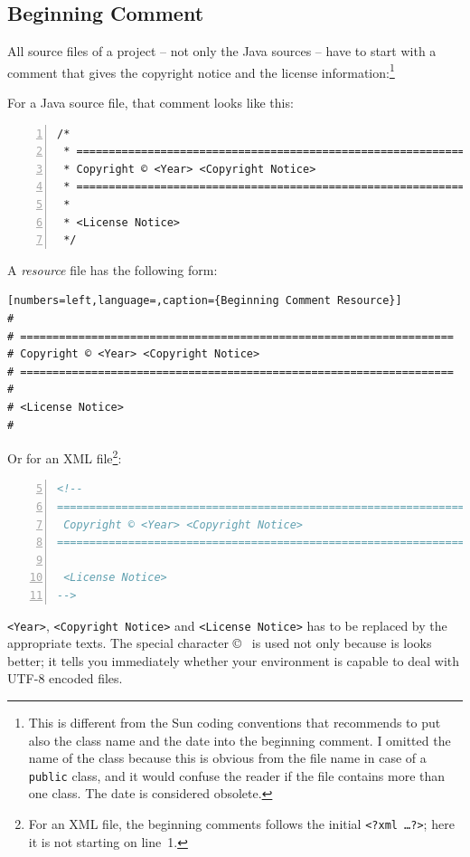 \documentclass[11pt,a4paper, titlepage, parskip=half, headsepline, footsepline, cleardoublepage=current, headheight=1cm]{scrbook}
\begin{document}
\subsection{Beginning Comment}\label{sec:BeginningComment}
All source files of a project – not only the Java sources – have to start with a comment that gives the copyright notice and the license information:\footnote{This is different from the Sun coding conventions\autocite{SUN_CODE_CONVENTIONS:BeginningComments} that recommends to put also the class name and the date into the beginning comment. I omitted the name of the class because this is obvious from the file name in case of a \lstinline|public| class, and it would confuse the reader if the file contains more than one class. The date is considered obsolete.}

For a Java source file, that comment looks like this:
\begin{lstlisting}[numbers=left,caption={Beginning Comment Java}]
/*
 * ==================================================================
 * Copyright © <Year> <Copyright Notice>
 * ==================================================================
 *
 * <License Notice>
 */
\end{lstlisting}

A \textit{resource} file has the following form: 
\begin{lstlisting}[numbers=left,language=,caption={Beginning Comment Resource}]
#
# ===================================================================
# Copyright © <Year> <Copyright Notice>
# ===================================================================
#
# <License Notice>
#
\end{lstlisting}

Or for an XML file\footnote{For an XML file, the beginning comments follows the initial \lstinline|<?xml …?>|; here it is not starting on line~1.}:
\begin{lstlisting}[numbers=left,firstnumber=5,language=XML,caption={Beginning Comment XML}]
<!--
=====================================================================
 Copyright © <Year> <Copyright Notice>
=====================================================================

 <License Notice>
-->
\end{lstlisting}

\verb#<Year>#, \verb#<Copyright Notice># and \verb#<License Notice># has to be replaced by the appropriate texts. The special character \copyright~ is used not only because is looks better; it tells you immediately whether your environment is capable to deal with UTF-8 encoded files.
\end{document}
